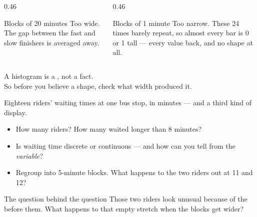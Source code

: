 \documentclass[aspectratio=169, 11pt]{beamer}
\begin{document}
\begin{frame}[t, plain]
  \vspace{10pt}
  \begin{columns}[t]
    \begin{column}{0.46\textwidth}
      \begin{block}{Blocks of 20 minutes}
        Too wide. The gap between the fast and slow finishers is averaged away.
      \end{block}
    \end{column}
    \begin{column}{0.46\textwidth}
      \begin{block}{Blocks of 1 minute}
        Too narrow. These 24 times barely repeat, so almost every bar is 0 or 1 tall ---
        every value back, and no shape at all.
      \end{block}
    \end{column}
  \end{columns}
  \vspace{16pt}
  \begin{center}
    {\large A histogram is a , not a fact.}\\[8pt]
    {\small\color{slate} So before you believe a shape, check what width produced it.}
  \end{center}
\end{frame}

\begin{frame}[t, plain]
  Eighteen riders' waiting times at one bus stop, in minutes --- and a third kind of display.
  \begin{itemize}\setlength{\itemsep}{5pt}
    \item How many riders? How many waited longer than 8 minutes?
    \item Is waiting time discrete or continuous --- and how can you tell from the
          \emph{variable}?
    \item Regroup into 5-minute blocks. What happens to the two riders out at 11 and 12?
  \end{itemize}
  \begin{block}{The question behind the question}
    Those two riders look unusual because of the  before them. What
    happens to that empty stretch when the blocks get wider?
  \end{block}
\end{frame}
\end{document}

